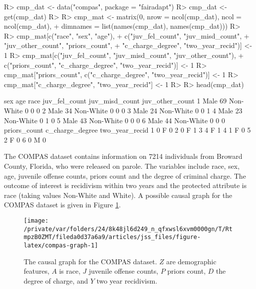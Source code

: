 \documentclass[
  nojss]{jss}
\begin{document}
\begin{CodeChunk}
\begin{CodeInput}
R> cmp_dat <- data("compas", package = "fairadapt")
R> cmp_dat <- get(cmp_dat)
R> 
R> cmp_mat <- matrix(0, nrow = ncol(cmp_dat), ncol = ncol(cmp_dat),
+                   dimnames = list(names(cmp_dat), names(cmp_dat)))
R> 
R> cmp_mat[c("race", "sex", "age"),
+         c("juv_fel_count", "juv_misd_count",
+           "juv_other_count", "priors_count",
+           "c_charge_degree", "two_year_recid")] <- 1
R> cmp_mat[c("juv_fel_count", "juv_misd_count", "juv_other_count"),
+         c("priors_count", "c_charge_degree", "two_year_recid")] <- 1
R> cmp_mat["priors_count", c("c_charge_degree", "two_year_recid")] <- 1
R> cmp_mat["c_charge_degree", "two_year_recid"] <- 1
R> 
R> head(cmp_dat)
\end{CodeInput}
\begin{CodeOutput}
   sex age      race juv_fel_count juv_misd_count juv_other_count
1 Male  69 Non-White             0              0               0
2 Male  34 Non-White             0              0               0
3 Male  24 Non-White             0              0               1
4 Male  23 Non-White             0              1               0
5 Male  43 Non-White             0              0               0
6 Male  44 Non-White             0              0               0
  priors_count c_charge_degree two_year_recid
1            0               F              0
2            0               F              1
3            4               F              1
4            1               F              0
5            2               F              0
6            0               M              0
\end{CodeOutput}
\end{CodeChunk}

The COMPAS dataset contains information on 7214 individuals from Broward
County, Florida, who were released on parole. The variables include
race, sex, age, juvenile offense counts, priors count and the degree of
criminal charge. The outcome of interest is recidivism within two years
and the protected attribute is race (taking values Non-White and White).
A possible causal graph for the COMPAS dataset is given in Figure
\ref{fig:compas-graph}.

\begin{CodeChunk}
\begin{figure}

{\centering \texttt{[image: /private/var/folders/24/8k48jl6d249\_n\_qfxwsl6xvm0000gn/T/RtmpzB0ZMT/fileda0d37a6a9/articles/jss\_files/figure-latex/compas-graph-1]} 

}

\caption[The causal graph for the COMPAS dataset]{The causal graph for the COMPAS dataset. $Z$ are demographic features, $A$ is race, $J$ juvenile offense counts, $P$ priors count, $D$ the degree of charge, and $Y$ two year recidivism.}\label{fig:compas-graph}
\end{figure}
\end{CodeChunk}
\end{document}
